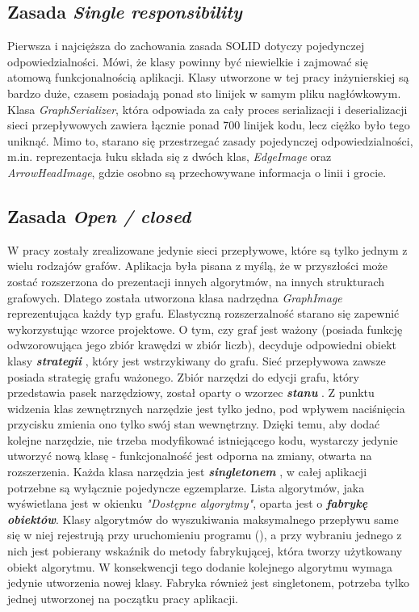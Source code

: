 \subsection{Zasada \textit{Single responsibility}}
Pierwsza i najcięższa do zachowania zasada SOLID dotyczy pojedynczej odpowiedzialności. Mówi, że klasy powinny być niewielkie i zajmować się atomową funkcjonalnością aplikacji. Klasy utworzone w tej pracy inżynierskiej są bardzo duże, czasem posiadają ponad sto linijek w samym pliku nagłówkowym. Klasa \emph{GraphSerializer}, która odpowiada za cały proces serializacji i deserializacji sieci przepływowych zawiera łącznie ponad 700 linijek kodu, lecz ciężko było tego uniknąć. Mimo to, starano się przestrzegać zasady pojedynczej odpowiedzialności, m.in. reprezentacja łuku składa się z dwóch klas, \emph{EdgeImage} oraz \emph{ArrowHeadImage}, gdzie osobno są przechowywane informacja o linii i grocie.
\subsection{Zasada \textit{Open / closed}}
W pracy zostały zrealizowane jedynie sieci przepływowe, które są tylko jednym z wielu rodzajów grafów. Aplikacja była pisana z myślą, że w przyszłości może zostać rozszerzona do prezentacji innych algorytmów, na innych strukturach grafowych. Dlatego została utworzona klasa nadrzędna \emph{GraphImage} reprezentująca każdy typ grafu. Elastyczną rozszerzalność starano się zapewnić wykorzystując wzorce projektowe. O tym, czy graf jest ważony (posiada funkcję odwzorowująca jego zbiór krawędzi w zbiór liczb), decyduje odpowiedni obiekt klasy \textbf{\textit{strategii}} \cite{id:WzorceProjektowe}, który jest wstrzykiwany do grafu. Sieć przepływowa zawsze posiada strategię grafu ważonego. Zbiór narzędzi do edycji grafu, który przedstawia pasek narzędziowy, został oparty o wzorzec \textbf{\textit{stanu}} \cite{id:WzorceProjektowe}. Z punktu widzenia klas zewnętrznych narzędzie jest tylko jedno, pod wpływem naciśnięcia przycisku zmienia ono tylko swój stan wewnętrzny. Dzięki temu, aby dodać kolejne narzędzie, nie trzeba modyfikować istniejącego kodu, wystarczy jedynie utworzyć nową klasę - funkcjonalność jest odporna na zmiany, otwarta na rozszerzenia. Każda klasa narzędzia jest \textbf{\textit{singletonem}} \cite{id:WzorceCpp}, w całej aplikacji potrzebne są wyłącznie pojedyncze egzemplarze. Lista algorytmów, jaka wyświetlana jest w okienku \textit{"Dostępne algorytmy"}, oparta  jest o \textbf{\textit{fabrykę obiektów}}. Klasy algorytmów do wyszukiwania maksymalnego przepływu same się w niej rejestrują przy uruchomieniu programu (\cite{id:WzorceCpp}), a przy wybraniu jednego z nich jest pobierany wskaźnik do metody fabrykującej, która tworzy użytkowany obiekt algorytmu. W konsekwencji tego dodanie kolejnego algorytmu wymaga jedynie utworzenia nowej klasy. Fabryka również jest singletonem, potrzeba tylko jednej utworzonej na początku pracy aplikacji.

